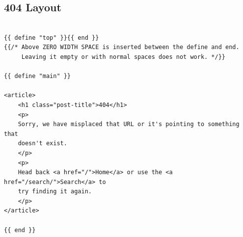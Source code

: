 \documentclass[11pt]{article}
\begin{document}
\subsection{404 Layout}
\label{sec:org305de1d}
\begin{verbatim}

{{ define "top" }}​{{ end }}
{{/* Above ZERO WIDTH SPACE is inserted between the define and end.
     Leaving it empty or with normal spaces does not work. */}}

{{ define "main" }}

<article>
    <h1 class="post-title">404</h1>
    <p>
	Sorry, we have misplaced that URL or it's pointing to something that
	doesn't exist.
    </p>
    <p>
	Head back <a href="/">Home</a> or use the <a href="/search/">Search</a> to
	try finding it again.
    </p>
</article>

{{ end }}
\end{verbatim}
\end{document}
